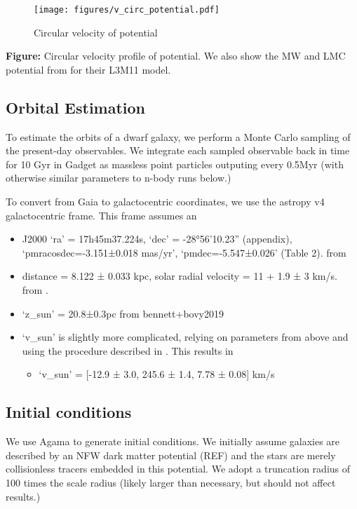 \begin{figure}
\centering
\texttt{[image: figures/v\_circ\_potential.pdf]}
\caption{Circular velocity of potential}\label{fig:v_circ_potential}
\end{figure}

\textbf{Figure:} Circular velocity profile of \citet{EP2020} potential.
We also show the MW and LMC potential from \citet{vasiliev2024} for
their L3M11 model.

\subsection{Orbital Estimation}\label{orbital-estimation}

To estimate the orbits of a dwarf galaxy, we perform a Monte Carlo
sampling of the present-day observables. We integrate each sampled
observable back in time for 10 Gyr in Gadget as massless point particles
outputing every 0.5Myr (with otherwise similar parameters to n-body runs
below.)

To convert from Gaia to galactocentric coordinates, we use the astropy
v4 galactocentric frame. This frame assumes an

\begin{itemize}
\tightlist
\item
  J2000 `ra' = 17h45m37.224s, `dec' = -28°56'10.23'' (appendix),
  `pmracosdec=-3.151±0.018 mas/yr', `pmdec=-5.547±0.026' (Table 2). from
  \citet{reid+brunthaler2004}
\item
  distance = 8.122 ± 0.033 kpc, solar radial velocity = 11 + 1.9 ± 3
  km/s. from \citet{gravitycollaboration+2018}.
\item
  `z\_sun' = 20.8±0.3pc from bennett+bovy2019
\item
  `v\_sun' is slightly more complicated, relying on parameters from
  above and using the procedure described in \citet{drimmel+poggio2018}.
  This results in

  \begin{itemize}
  \tightlist
  \item
    `v\_sun' = {[}-12.9 ± 3.0, 245.6 ± 1.4, 7.78 ± 0.08{]} km/s
  \end{itemize}
\end{itemize}

\subsection{Initial conditions}\label{initial-conditions}

We use Agama \citep{agama} to generate initial conditions. We initially
assume galaxies are described by an NFW dark matter potential (REF) and
the stars are merely collisionless tracers embedded in this potential.
We adopt a truncation radius of 100 times the scale radius (likely
larger than necessary, but should not affect results.)

